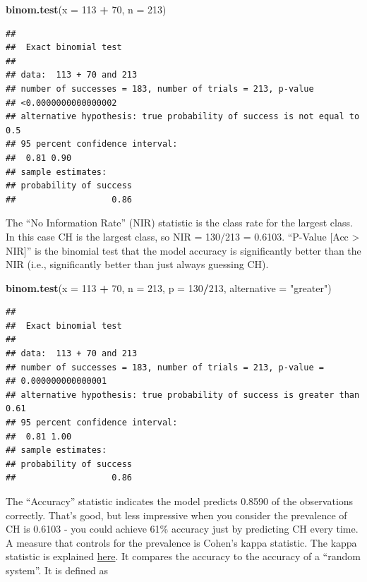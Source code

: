 \documentclass[
]{book}
\newenvironment{Shaded}{\begin{snugshade}}{\end{snugshade}}
\newcommand{\DataTypeTok}[1]{\textcolor[rgb]{0.13,0.29,0.53}{#1}}
\newcommand{\DecValTok}[1]{\textcolor[rgb]{0.00,0.00,0.81}{#1}}
\newcommand{\KeywordTok}[1]{\textcolor[rgb]{0.13,0.29,0.53}{\textbf{#1}}}
\newcommand{\NormalTok}[1]{#1}
\newcommand{\OperatorTok}[1]{\textcolor[rgb]{0.81,0.36,0.00}{\textbf{#1}}}
\newcommand{\StringTok}[1]{\textcolor[rgb]{0.31,0.60,0.02}{#1}}
\begin{document}
\begin{Shaded}
\begin{Highlighting}[]
\KeywordTok{binom.test}\NormalTok{(}\DataTypeTok{x =} \DecValTok{113} \OperatorTok{+}\StringTok{ }\DecValTok{70}\NormalTok{, }\DataTypeTok{n =} \DecValTok{213}\NormalTok{)}
\end{Highlighting}
\end{Shaded}

\begin{verbatim}
## 
##  Exact binomial test
## 
## data:  113 + 70 and 213
## number of successes = 183, number of trials = 213, p-value
## <0.0000000000000002
## alternative hypothesis: true probability of success is not equal to 0.5
## 95 percent confidence interval:
##  0.81 0.90
## sample estimates:
## probability of success 
##                   0.86
\end{verbatim}

The ``No Information Rate'' (NIR) statistic is the class rate for the largest class. In this case CH is the largest class, so NIR = 130/213 = 0.6103. ``P-Value {[}Acc \textgreater{} NIR{]}'' is the binomial test that the model accuracy is significantly better than the NIR (i.e., significantly better than just always guessing CH).

\begin{Shaded}
\begin{Highlighting}[]
\KeywordTok{binom.test}\NormalTok{(}\DataTypeTok{x =} \DecValTok{113} \OperatorTok{+}\StringTok{ }\DecValTok{70}\NormalTok{, }\DataTypeTok{n =} \DecValTok{213}\NormalTok{, }\DataTypeTok{p =} \DecValTok{130}\OperatorTok{/}\DecValTok{213}\NormalTok{, }\DataTypeTok{alternative =} \StringTok{"greater"}\NormalTok{)}
\end{Highlighting}
\end{Shaded}

\begin{verbatim}
## 
##  Exact binomial test
## 
## data:  113 + 70 and 213
## number of successes = 183, number of trials = 213, p-value =
## 0.000000000000001
## alternative hypothesis: true probability of success is greater than 0.61
## 95 percent confidence interval:
##  0.81 1.00
## sample estimates:
## probability of success 
##                   0.86
\end{verbatim}

The ``Accuracy'' statistic indicates the model predicts 0.8590 of the observations correctly. That's good, but less impressive when you consider the prevalence of CH is 0.6103 - you could achieve 61\% accuracy just by predicting CH every time. A measure that controls for the prevalence is Cohen's kappa statistic. The kappa statistic is explained \href{https://standardwisdom.com/softwarejournal/2011/12/confusion-matrix-another-single-value-metric-kappa-statistic/}{here}. It compares the accuracy to the accuracy of a ``random system''. It is defined as
\end{document}
